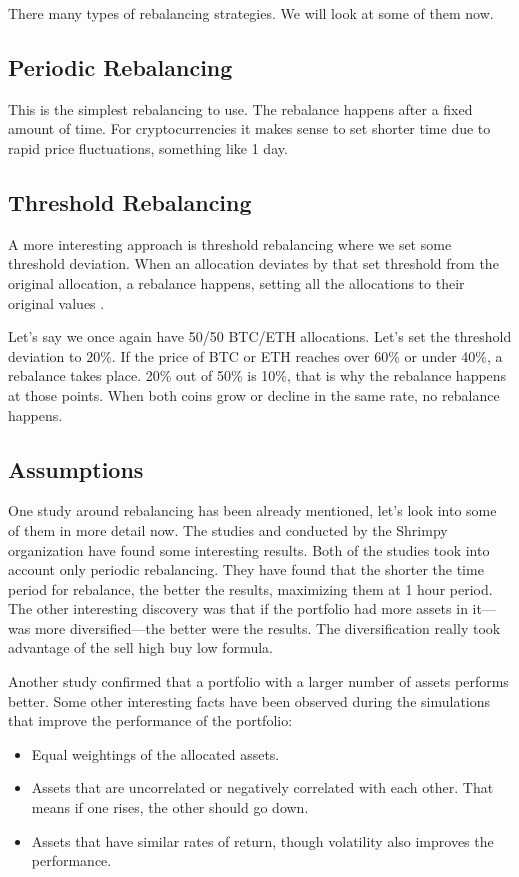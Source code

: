 There many types of rebalancing strategies. We will look at some of them now.

\subsection*{Periodic Rebalancing}
This is the simplest rebalancing to use. The rebalance happens after a fixed amount of time. For cryptocurrencies it makes sense to set shorter time due to rapid price fluctuations, something like 1 day.

\subsection*{Threshold Rebalancing}
A more interesting approach is threshold rebalancing where we set some threshold deviation. When an allocation deviates by that set threshold from the original allocation, a rebalance happens, setting all the allocations to their original values \cite{portfolio-rebalancing}.

Let's say we once again have 50/50 BTC/ETH allocations. Let's set the threshold deviation to $20\%$. If the price of BTC or ETH reaches over 60\% or under 40\%, a rebalance takes place. 20\% out of 50\% is 10\%, that is why the rebalance happens at those points. When both coins grow or decline in the same rate, no rebalance happens.

\subsection*{Assumptions}
One study around rebalancing has been already mentioned, let's look into some of them in more detail now. The studies \cite{portfolio-diversity} and \cite{diversify-perform-better} conducted by the Shrimpy organization have found some interesting results. Both of the studies took into account only periodic rebalancing. They have found that the shorter the time period for rebalance, the better the results, maximizing them at 1 hour period. The other interesting discovery was that if the portfolio had more assets in it---was more diversified---the better were the results. The diversification really took advantage of the sell high buy low formula.

Another study \cite{rebalancing-strategy} confirmed that a portfolio with a larger number of assets performs better. Some other interesting facts have been observed during the simulations that improve the performance of the portfolio:
\begin{itemize}
    \item Equal weightings of the allocated assets.
    \item Assets that are uncorrelated or negatively correlated with each other. That means if one rises, the other should go down. 
    \item Assets that have similar rates of return, though volatility also improves the performance.
\end{itemize}

